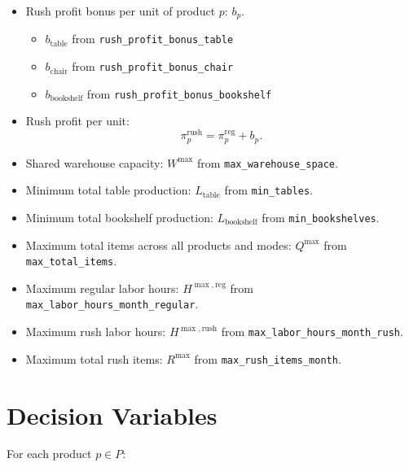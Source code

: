 \begin{itemize}
    \item Rush profit bonus per unit of product $p$: $b_p$.
    \begin{itemize}
        \item $b_{\text{table}}$ from \texttt{rush\_profit\_bonus\_table}
        \item $b_{\text{chair}}$ from \texttt{rush\_profit\_bonus\_chair}
        \item $b_{\text{bookshelf}}$ from \texttt{rush\_profit\_bonus\_bookshelf}
    \end{itemize}

    \item Rush profit per unit:
    \[
    \pi_p^{\mathrm{rush}} = \pi_p^{\mathrm{reg}} + b_p.
    \]

    \item Shared warehouse capacity: $W^{\max}$ from \texttt{max\_warehouse\_space}.
    \item Minimum total table production: $L_{\text{table}}$ from \texttt{min\_tables}.
    \item Minimum total bookshelf production: $L_{\text{bookshelf}}$ from \texttt{min\_bookshelves}.
    \item Maximum total items across all products and modes: $Q^{\max}$ from \texttt{max\_total\_items}.
    \item Maximum regular labor hours: $H^{\max,\mathrm{reg}}$ from \texttt{max\_labor\_hours\_month\_regular}.
    \item Maximum rush labor hours: $H^{\max,\mathrm{rush}}$ from \texttt{max\_labor\_hours\_month\_rush}.
    \item Maximum total rush items: $R^{\max}$ from \texttt{max\_rush\_items\_month}.
\end{itemize}

\section*{Decision Variables}

For each product $p \in P$:

